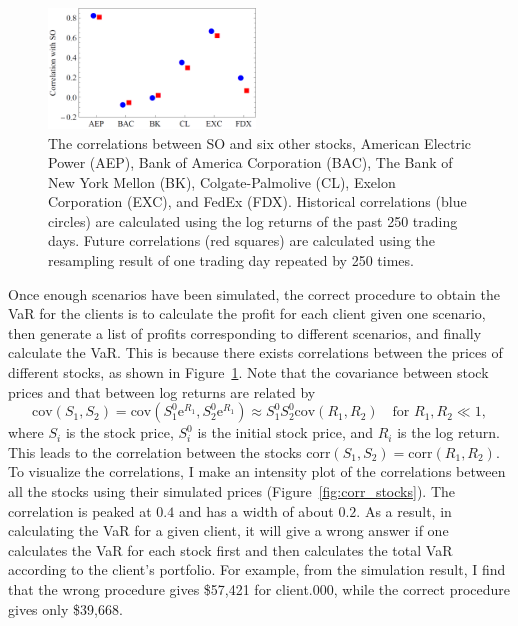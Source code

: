 \documentclass[letterpaper,11pt]{article}
\begin{document}
\begin{figure}[h]
\centering
\includegraphics[width=0.49\textwidth]{corr_SO.png}
\caption{The correlations between SO and six other stocks, American Electric Power (AEP), Bank of America Corporation (BAC), The Bank of New York Mellon (BK), Colgate-Palmolive (CL), Exelon Corporation (EXC), and FedEx (FDX).
Historical correlations (blue circles) are calculated using the log returns of the past 250 trading days.
Future correlations (red squares) are calculated using the resampling result of one trading day repeated by 250 times.}
\label{fig:corr_SO}
\end{figure}

Once enough scenarios have been simulated, the correct procedure to obtain the VaR for the clients is to calculate the profit for each client given one scenario, then generate a list of profits corresponding to different scenarios, and finally calculate the VaR.
This is because there exists correlations between the prices of different stocks, as shown in Figure~\ref{fig:corr_SO}.
Note that the covariance between stock prices and that between log returns are related by
\begin{equation}
\text{cov}(S_1,S_2)=\text{cov}(S_1^0\text{e}^{R_1},S_2^0\text{e}^{R_1})\approx
S_1^0S_2^0\text{cov}(R_1,R_2)\quad\text{for } R_1,R_2\ll1,
\end{equation}
where $S_i$ is the stock price, $S_i^0$ is the initial stock price, and $R_i$ is the log return.
This leads to the correlation between the stocks $\text{corr}(S_1,S_2)=\text{corr}(R_1,R_2)$.
To visualize the correlations, I make an intensity plot of the correlations between all the stocks using their simulated prices (Figure~\ref{fig:corr_stocks}).
The correlation is peaked at $0.4$ and has a width of about $0.2$.
As a result, in calculating the VaR for a given client, it will give a wrong answer if one calculates the VaR for each stock first and then calculates the total VaR according to the client's portfolio.
For example, from the simulation result, I find that the wrong procedure gives \$57,421 for client.000, while the correct procedure gives only \$39,668.
\end{document}
